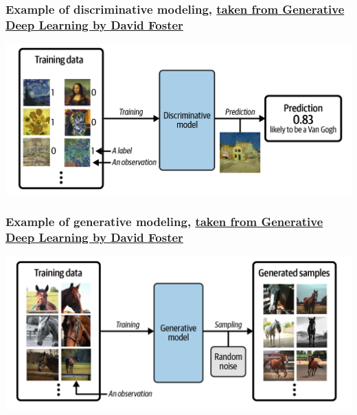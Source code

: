 \documentclass{beamer}
\begin{document}
\begin{frame}
\frametitle{Example of discriminative modeling, \href{{https://www.oreilly.com/library/view/generative-deep-learning/9781098134174/ch01.html}}{taken from Generative Deep Learning by David Foster}}

\vspace{6mm}

\centerline{\includegraphics[width=1.0\linewidth]{figures/standarddeeplearning.png}}

\vspace{6mm}
\end{frame}

\begin{frame}
\frametitle{Example of generative modeling, \href{{https://www.oreilly.com/library/view/generative-deep-learning/9781098134174/ch01.html}}{taken from Generative Deep Learning by David Foster}}

\vspace{6mm}

\centerline{\includegraphics[width=1.0\linewidth]{figures/generativelearning.png}}

\vspace{6mm}
\end{frame}
\end{document}
